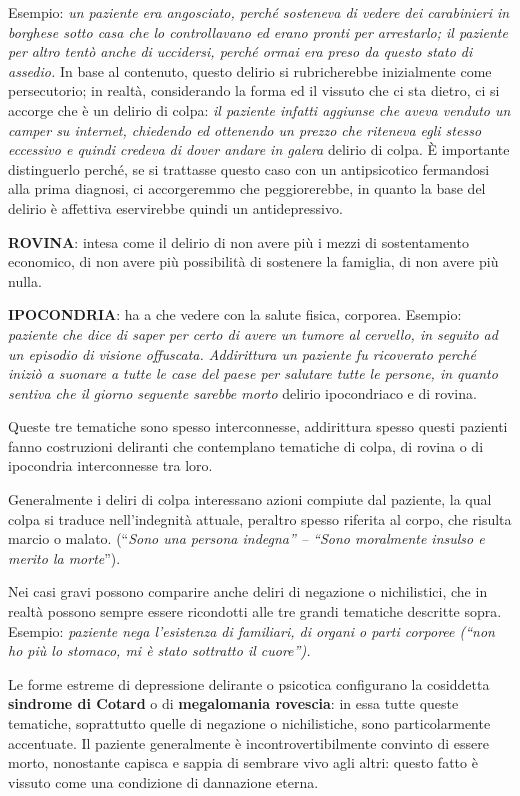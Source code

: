 \begin{itemize}
\begin{itemize}
  Esempio: \emph{un paziente era angosciato, perché sosteneva di vedere
  dei carabinieri in borghese sotto casa che lo controllavano ed erano
  pronti per arrestarlo; il paziente per altro tentò anche di uccidersi,
  perché ormai era preso da questo stato di assedio.} In base al
  contenuto, questo delirio si rubricherebbe inizialmente come
  persecutorio; in realtà, considerando la forma ed il vissuto che ci
  sta dietro, ci si accorge che è un delirio di colpa: \emph{il paziente
  infatti aggiunse che aveva venduto un camper su internet, chiedendo ed
  ottenendo un prezzo che riteneva egli stesso eccessivo e quindi
  credeva di dover andare in galera} delirio di colpa. È importante
  distinguerlo perché, se si trattasse questo caso con un antipsicotico
  fermandosi alla prima diagnosi, ci accorgeremmo che peggiorerebbe, in
  quanto la base del delirio è affettiva eservirebbe quindi un
  antidepressivo.

  \textbf{ROVINA}: intesa come il delirio di non avere più i mezzi di
  sostentamento economico, di non avere più possibilità di sostenere la
  famiglia, di non avere più nulla.

  \textbf{IPOCONDRIA}: ha a che vedere con la salute fisica, corporea.
  Esempio: \emph{paziente che dice di saper per certo di avere un tumore
  al cervello, in seguito ad un episodio di visione offuscata.
  Addirittura un paziente fu ricoverato perché iniziò a suonare a tutte
  le case del paese per salutare tutte le persone, in quanto sentiva che
  il giorno seguente sarebbe morto} delirio ipocondriaco e di rovina.

  Queste tre tematiche sono spesso interconnesse, addirittura spesso
  questi pazienti fanno costruzioni deliranti che contemplano tematiche
  di colpa, di rovina o di ipocondria interconnesse tra loro.

  Generalmente i deliri di colpa interessano azioni compiute dal
  paziente, la qual colpa si traduce nell'indegnità attuale, peraltro
  spesso riferita al corpo, che risulta marcio o malato. (``\emph{Sono
  una persona indegna'' -- ``Sono moralmente insulso e merito la
  morte}'').

  Nei casi gravi possono comparire anche deliri di negazione o
  nichilistici, che in realtà possono sempre essere ricondotti alle tre
  grandi tematiche descritte sopra. Esempio: \emph{paziente nega
  l'esistenza di familiari, di organi o parti corporee (``non ho più lo
  stomaco, mi è stato sottratto il cuore''). }

  Le forme estreme di depressione delirante o psicotica configurano la
  cosiddetta \textbf{sindrome di Cotard} o di \textbf{megalomania
  rovescia}: in essa tutte queste tematiche, soprattutto quelle di
  negazione o nichilistiche, sono particolarmente accentuate. Il
  paziente generalmente è incontrovertibilmente convinto di essere
  morto, nonostante capisca e sappia di sembrare vivo agli altri: questo
  fatto è vissuto come una condizione di dannazione eterna.


\end{itemize}
\end{itemize}
